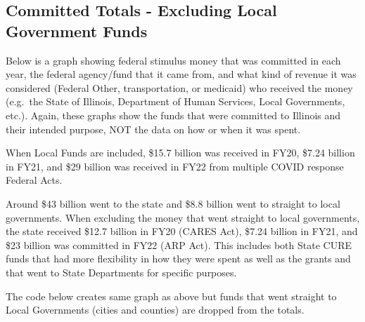 \documentclass[
  letterpaper,
  DIV=11,
  numbers=noendperiod]{scrreport}
\begin{document}
\hypertarget{committed-totals---excluding-local-government-funds}{%
\subsection{Committed Totals - Excluding Local Government
Funds}\label{committed-totals---excluding-local-government-funds}}

Below is a graph showing federal stimulus money that was committed in
each year, the federal agency/fund that it came from, and what kind of
revenue it was considered (Federal Other, transportation, or medicaid)
who received the money (e.g.~the State of Illinois, Department of Human
Services, Local Governments, etc.). Again, these graphs show the funds
that were committed to Illinois and their intended purpose, NOT the data
on how or when it was spent.

When Local Funds are included, \$15.7 billion was received in FY20,
\$7.24 billion in FY21, and \$29 billion was received in FY22 from
multiple COVID response Federal Acts.

Around \$43 billion went to the state and \$8.8 billion went to straight
to local governments. When excluding the money that went straight to
local governments, the state received \$12.7 billion in FY20 (CARES
Act), \$7.24 billion in FY21, and \$23 billion was committed in FY22
(ARP Act). This includes both State CURE funds that had more flexibility
in how they were spent as well as the grants and that went to State
Departments for specific purposes.

The code below creates same graph as above but funds that went straight
to Local Governments (cities and counties) are dropped from the totals.
\end{document}

